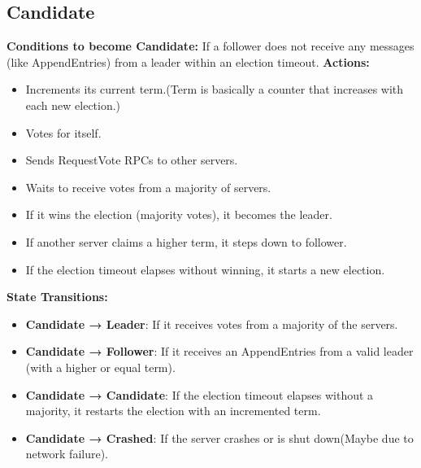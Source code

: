 \subsection{Candidate}
\textbf{Conditions to become Candidate:} If a follower does not receive any
messages (like AppendEntries) from a leader within an election timeout.
\newline
\textbf{Actions:}
\begin{itemize}
    \item Increments its current term.(Term is basically a counter that
        increases with each new election.)

    \item Votes for itself.

    \item Sends RequestVote RPCs to other servers.

    \item Waits to receive votes from a majority of servers.

    \item If it wins the election (majority votes), it becomes the leader.

    \item If another server claims a higher term, it steps down to follower.

    \item If the election timeout elapses without winning, it starts a new
        election.
\end{itemize}

\textbf{State Transitions:}
\begin{itemize}
    \item \textbf{Candidate → Leader}: If it receives votes from a majority of the
        servers.

    \item \textbf{Candidate → Follower}: If it receives an AppendEntries from a valid
        leader (with a higher or equal term).

    \item \textbf{Candidate → Candidate}: If the election timeout elapses without
        a majority, it restarts the election with an incremented term.

    \item \textbf{Candidate → Crashed}: If the server crashes or is shut down(Maybe
        due to network failure).
\end{itemize}

